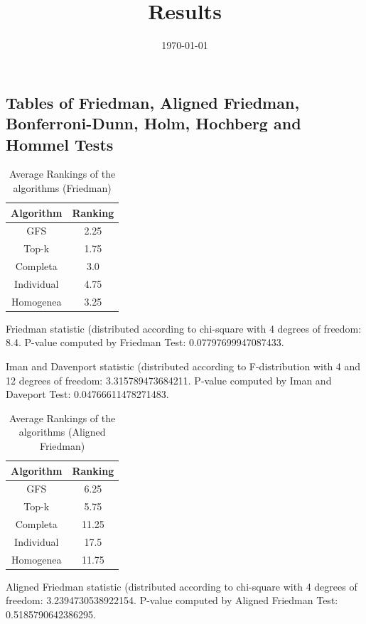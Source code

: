 \documentclass[a4paper,10pt]{article}
\title{Results}
\author{}
\date{\today}
\begin{document}
\begin{landscape}
\oddsidemargin 0in \topmargin 0in\maketitle
\section{Tables of Friedman, Aligned Friedman, Bonferroni-Dunn, Holm, Hochberg and Hommel Tests}
\begin{table}[!htp]
\centering
\caption{Average Rankings of the algorithms (Friedman)
}\begin{tabular}{c|c}
Algorithm&Ranking\\
\hline
GFS&2.25\\
Top-k&1.75\\
Completa&3.0\\
Individual&4.75\\
Homogenea&3.25\\
\end{tabular}
\end{table}


Friedman statistic (distributed according to chi-square with 4 degrees of freedom: 8.4. 
P-value computed by Friedman Test: 0.07797699947087433.\newline

Iman and Davenport statistic (distributed according to F-distribution with 4 and 12 degrees of freedom: 3.315789473684211. 
P-value computed by Iman and Daveport Test: 0.04766611478271483.\newline


\newpage

\begin{table}[!htp]
\centering
\caption{Average Rankings of the algorithms (Aligned Friedman)
}\begin{tabular}{c|c}
Algorithm&Ranking\\
\hline
GFS&6.25\\
Top-k&5.75\\
Completa&11.25\\
Individual&17.5\\
Homogenea&11.75\\
\end{tabular}
\end{table}


Aligned Friedman statistic (distributed according to chi-square with 4 degrees of freedom: 3.2394730538922154. 
P-value computed by Aligned Friedman Test: 0.5185790642386295.\newline



\end{landscape}
\end{document}
